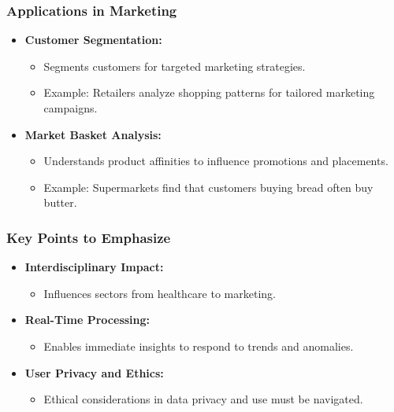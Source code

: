 \documentclass[aspectratio=169]{beamer}
\begin{document}
\begin{frame}[fragile]
    \frametitle{Applications in Marketing}
    \begin{itemize}
        \item \textbf{Customer Segmentation:}
            \begin{itemize}
                \item Segments customers for targeted marketing strategies.
                \item Example: Retailers analyze shopping patterns for tailored marketing campaigns.
            \end{itemize}
            
        \item \textbf{Market Basket Analysis:}
            \begin{itemize}
                \item Understands product affinities to influence promotions and placements.
                \item Example: Supermarkets find that customers buying bread often buy butter.
            \end{itemize}
    \end{itemize}
\end{frame}

\begin{frame}[fragile]
    \frametitle{Key Points to Emphasize}
    \begin{itemize}
        \item \textbf{Interdisciplinary Impact:} 
            \begin{itemize}
                \item Influences sectors from healthcare to marketing.
            \end{itemize}
        
        \item \textbf{Real-Time Processing:} 
            \begin{itemize}
                \item Enables immediate insights to respond to trends and anomalies.
            \end{itemize}
        
        \item \textbf{User Privacy and Ethics:} 
            \begin{itemize}
                \item Ethical considerations in data privacy and use must be navigated.
            \end{itemize}
    \end{itemize}
\end{frame}
\end{document}
